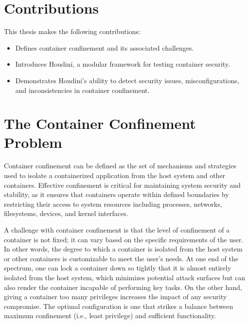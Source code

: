 \documentclass[12pt]{report}
\begin{document}
\begin{doublespace}
\section{Contributions}

This thesis makes the following contributions:
\begin{itemize}
    \item Defines container confinement and its associated challenges.
    \item Introduces Houdini, a modular framework for testing container security.
    \item Demonstrates Houdini’s ability to detect security issues, misconfigurations, and inconsistencies in container confinement.
\end{itemize}

\section{The Container Confinement Problem}

Container confinement can be defined as the set of mechanisms and strategies used to isolate a containerized application from the host system and other containers. Effective confinement is critical for maintaining system security and stability, as it ensures that containers operate within defined boundaries by restricting their access to system resources including processes, networks, filesystems, devices, and kernel interfaces. 

A challenge with container confinement is that the level of confinement of a container is not fixed; it can vary based on the specific requirements of the user. In other words, the degree to which a container is isolated from the host system or other containers is customizable to meet the user’s needs. At one end of the spectrum, one can lock a container down so tightly that it is almost entirely isolated from the host system, which minimizes potential attack surfaces but can also render the container incapable of performing key tasks. On the other hand, giving a container too many privileges increases the impact of any security compromise. The optimal configuration is one that strikes a balance between maximum confinement (i.e., least privilege) and sufficient functionality. 



\end{doublespace}
\end{document}
